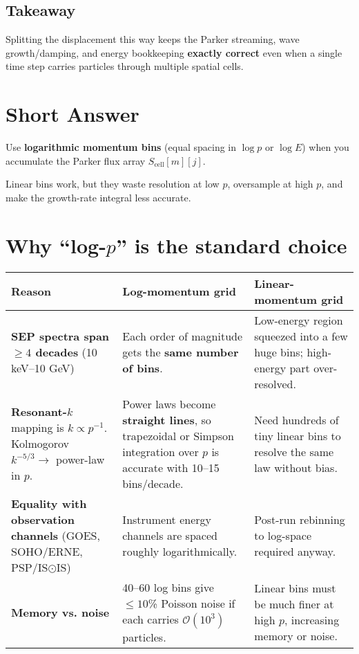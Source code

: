 \subsection*{Takeaway}

Splitting the displacement this way keeps the Parker streaming, wave growth/damping, and energy bookkeeping \textbf{exactly correct} even when a single time step carries particles through multiple spatial cells.

\section*{Short Answer}

Use \textbf{logarithmic momentum bins} (equal spacing in $\log p$ or $\log E$) when you accumulate the Parker flux array $S_{\text{cell}}[m][j]$.

Linear bins work, but they waste resolution at low $p$, oversample at high $p$, and make the growth-rate integral less accurate.

\section*{Why ``log-$p$'' is the standard choice}

\begin{center}
\begin{tabular}{@{}p{} | p{} | p{}@{}}
\toprule
\textbf{Reason} &
\textbf{Log-momentum grid} &
\textbf{Linear-momentum grid} \\
\midrule
\textbf{SEP spectra span $\geq 4$ decades} (10 keV–10 GeV) &
Each order of magnitude gets the \textbf{same number of bins}. &
Low-energy region squeezed into a few huge bins; high-energy part over-resolved. \\
\midrule
\textbf{Resonant-$k$} mapping is $k \propto p^{-1}$. Kolmogorov $k^{-5/3} \rightarrow$ power-law in $p$. &
Power laws become \textbf{straight lines}, so trapezoidal or Simpson integration over $p$ is accurate with 10--15 bins/decade. &
Need hundreds of tiny linear bins to resolve the same law without bias. \\
\midrule
\textbf{Equality with observation channels} (GOES, SOHO/ERNE, PSP/IS$\odot$IS) &
Instrument energy channels are spaced roughly logarithmically. &
Post-run rebinning to log-space required anyway. \\
\midrule
\textbf{Memory vs. noise} &
40--60 log bins give $\leq 10$\% Poisson noise if each carries $\mathcal{O}(10^3)$ particles. &
Linear bins must be much finer at high $p$, increasing memory or noise. \\
\bottomrule
\end{tabular}
\end{center}

